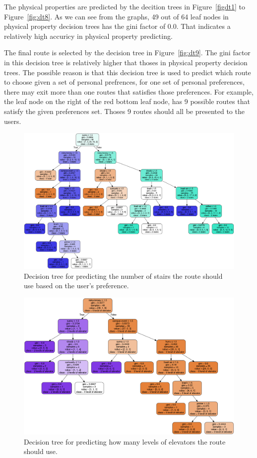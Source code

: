 \documentclass{sigchi}
\begin{document}
The physical properties are predicted by the decition trees in Figure~\ref{figdt1} to Figure~\ref{fig:dt8}. As we can see from the graphs, 49 out of 64 leaf nodes in physical property decision trees has the gini factor of 0.0. That indicates a relatively high accuricy in physical property predicting. 


The final route is selected by the decision tree in Figure~\ref{fig:dt9}. The gini factor in this decision tree is relatively higher that thoses in physical property decision trees. The possible reason is that this decision tree is used to predict which route to choose given a set of personal prefrences, for one set of personal preferences, there may exit more than one routes that satisfies those preferences. For example, the leaf node on the right of the red bottom leaf node, has 9 possible routes that satisfy the given preferences set. Thoses 9 routes should all be presented to the users. 


\begin{figure}[!h]
\centering
\includegraphics[width=2.0\columnwidth]{pics/decisionTree_1.png}
\caption{Decision tree for predicting the number of stairs the route should use based on the user’s preference.}
\label{fig:dt1}
\end{figure}

\begin{figure}[!h]
\centering
\includegraphics[width=2.0\columnwidth]{pics/decisionTree_2.png}
\caption{Decision tree for predicting how many levels of elevators the route should use.}
\label{fig:dt2}
\end{figure}
\end{document}

